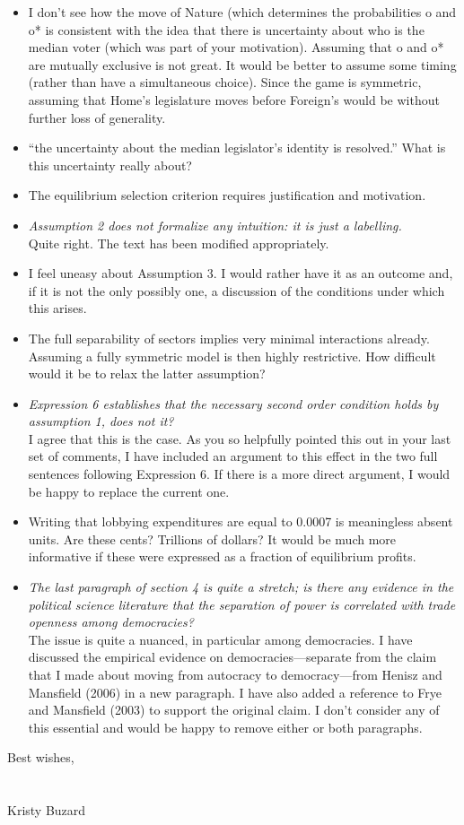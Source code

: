 \documentclass[12pt]{report}
\begin{document}
\begin{itemize}
  \item I don’t see how the move of Nature (which determines the probabilities o and o* is consistent with the idea that there is uncertainty about who is the median voter (which was part of your motivation). Assuming that o and o* are mutually exclusive is not great. It would be better to assume some timing (rather than have a simultaneous choice). Since the game is symmetric, assuming that Home’s legislature moves before Foreign’s would be without further loss of generality.
  \item “the uncertainty about the median legislator’s identity is resolved.” What is this uncertainty really about?
  \item The equilibrium selection criterion requires justification and motivation.
  \item \textit{Assumption 2 does not formalize any intuition: it is just a labelling.} \\
	Quite right. The text has been modified appropriately.
  \item I feel uneasy about Assumption 3. I would rather have it as an outcome and, if it is not the only possibly one, a discussion of the conditions under which this arises.
  \item The full separability of sectors implies very minimal interactions already. Assuming a fully symmetric model is then highly restrictive. How difficult would it be to relax the latter assumption?
  \item \textit{Expression 6 establishes that the necessary second order condition holds by assumption 1, does not it?} \\
	I agree that this is the case. As you so helpfully pointed this out in your last set of comments, I have included an argument to this effect in the two full sentences following Expression 6. If there is a more direct argument, I would be happy to replace the current one.
  \item Writing that lobbying expenditures are equal to 0.0007 is meaningless absent units. Are these cents? Trillions of dollars? It would be much more informative if these were expressed as a fraction of equilibrium profits.
  \item \textit{The last paragraph of section 4 is quite a stretch; is there any evidence in the political science literature that the separation of power is correlated with trade openness among democracies?} \\
	The issue is quite a nuanced, in particular among democracies. I have discussed the empirical evidence on democracies---separate from the claim that I made about moving from autocracy to democracy---from Henisz and Mansfield (2006) in a new paragraph. I have also added a reference to Frye and Mansfield (2003) to support the original claim. I don't consider any of this essential and would be happy to remove either or both paragraphs.
\end{itemize}


Best wishes,\\
\\
\\
Kristy Buzard
\end{document}

